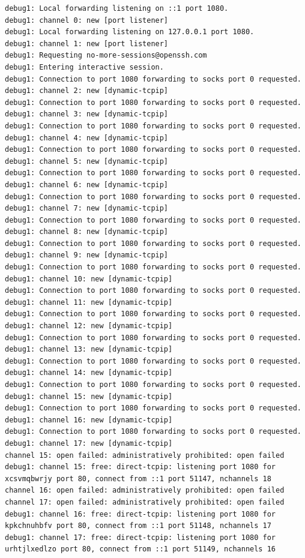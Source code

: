 \documentclass[11pt]{article}
\begin{document}
\begin{lstlisting}
debug1: Local forwarding listening on ::1 port 1080.
debug1: channel 0: new [port listener]
debug1: Local forwarding listening on 127.0.0.1 port 1080.
debug1: channel 1: new [port listener]
debug1: Requesting no-more-sessions@openssh.com
debug1: Entering interactive session.
debug1: Connection to port 1080 forwarding to socks port 0 requested.
debug1: channel 2: new [dynamic-tcpip]
debug1: Connection to port 1080 forwarding to socks port 0 requested.
debug1: channel 3: new [dynamic-tcpip]
debug1: Connection to port 1080 forwarding to socks port 0 requested.
debug1: channel 4: new [dynamic-tcpip]
debug1: Connection to port 1080 forwarding to socks port 0 requested.
debug1: channel 5: new [dynamic-tcpip]
debug1: Connection to port 1080 forwarding to socks port 0 requested.
debug1: channel 6: new [dynamic-tcpip]
debug1: Connection to port 1080 forwarding to socks port 0 requested.
debug1: channel 7: new [dynamic-tcpip]
debug1: Connection to port 1080 forwarding to socks port 0 requested.
debug1: channel 8: new [dynamic-tcpip]
debug1: Connection to port 1080 forwarding to socks port 0 requested.
debug1: channel 9: new [dynamic-tcpip]
debug1: Connection to port 1080 forwarding to socks port 0 requested.
debug1: channel 10: new [dynamic-tcpip]
debug1: Connection to port 1080 forwarding to socks port 0 requested.
debug1: channel 11: new [dynamic-tcpip]
debug1: Connection to port 1080 forwarding to socks port 0 requested.
debug1: channel 12: new [dynamic-tcpip]
debug1: Connection to port 1080 forwarding to socks port 0 requested.
debug1: channel 13: new [dynamic-tcpip]
debug1: Connection to port 1080 forwarding to socks port 0 requested.
debug1: channel 14: new [dynamic-tcpip]
debug1: Connection to port 1080 forwarding to socks port 0 requested.
debug1: channel 15: new [dynamic-tcpip]
debug1: Connection to port 1080 forwarding to socks port 0 requested.
debug1: channel 16: new [dynamic-tcpip]
debug1: Connection to port 1080 forwarding to socks port 0 requested.
debug1: channel 17: new [dynamic-tcpip]
channel 15: open failed: administratively prohibited: open failed
debug1: channel 15: free: direct-tcpip: listening port 1080 for xcsvmqbwrjy port 80, connect from ::1 port 51147, nchannels 18
channel 16: open failed: administratively prohibited: open failed
channel 17: open failed: administratively prohibited: open failed
debug1: channel 16: free: direct-tcpip: listening port 1080 for kpkchnuhbfv port 80, connect from ::1 port 51148, nchannels 17
debug1: channel 17: free: direct-tcpip: listening port 1080 for urhtjlxedlzo port 80, connect from ::1 port 51149, nchannels 16

\end{lstlisting}
\end{document}
